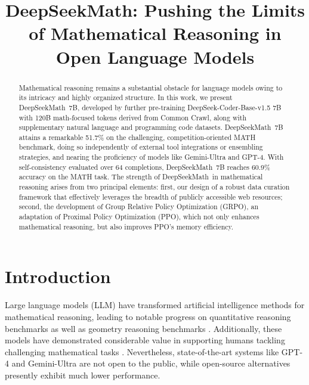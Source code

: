 \title{DeepSeekMath: Pushing the Limits of Mathematical Reasoning in Open Language Models}

\begin{abstract}
Mathematical reasoning remains a substantial obstacle for language models owing to its intricacy and highly organized structure. In this work, we present DeepSeekMath~7B, developed by further pre-training DeepSeek-Coder-Base-v1.5 7B with 120B math-focused tokens derived from Common Crawl, along with supplementary natural language and programming code datasets. DeepSeekMath~7B attains a remarkable 51.7\% on the challenging, competition-oriented MATH benchmark, doing so independently of external tool integrations or ensembling strategies, and nearing the proficiency of models like Gemini-Ultra and GPT-4. With self-consistency evaluated over 64 completions, DeepSeekMath~7B reaches 60.9\% accuracy on the MATH task. The strength of DeepSeekMath~in mathematical reasoning arises from two principal elements: first, our design of a robust data curation framework that effectively leverages the breadth of publicly accessible web resources; second, the development of Group Relative Policy Optimization (GRPO), an adaptation of Proximal Policy Optimization (PPO), which not only enhances mathematical reasoning, but also improves PPO’s memory efficiency.
\end{abstract}

\section{Introduction}

Large language models (LLM) have transformed artificial intelligence methods for mathematical reasoning, leading to notable progress on quantitative reasoning benchmarks \citep{MATH} as well as geometry reasoning benchmarks \citep{trinh2024solving}. Additionally, these models have demonstrated considerable value in supporting humans tackling challenging mathematical tasks \citep{tao}. Nevertheless, state-of-the-art systems like GPT-4 \citep{gpt4} and Gemini-Ultra \citep{gemini} are not open to the public, while open-source alternatives presently exhibit much lower performance.

